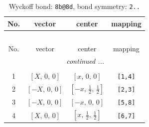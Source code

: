 \documentclass[fleqn,8pt]{jsarticle}
\begin{document}
\renewcommand{\arraystretch}{1.2}
\begin{longtable}{cccc}
\caption{Wyckoff bond: {\tt 8b@8d}, bond symmetry: {\tt 2..}}
 \\
 \hline \hline
No. & vector & center & mapping \\ \hline \endfirsthead

\multicolumn{3}{l}{\tablename\ \thetable{}} \\
 \hline \hline
No. & vector & center & mapping \\ \hline \endhead

 \hline \hline
\multicolumn{3}{r}{\footnotesize\it continued ...} \\ \endfoot

 \hline \hline
\multicolumn{3}{r}{} \\ \endlastfoot

1 & $\left[ X,\, 0,\, 0 \right]$ & $\left[ x,\, 0,\, 0 \right]$ & {\tt [1,4]} \\ \hline
2 & $\left[ - X,\, 0,\, 0 \right]$ & $\left[ - x,\, \frac{1}{2},\, \frac{1}{2} \right]$ & {\tt [2,3]} \\ \hline
3 & $\left[ - X,\, 0,\, 0 \right]$ & $\left[ - x,\, 0,\, 0 \right]$ & {\tt [5,8]} \\ \hline
4 & $\left[ X,\, 0,\, 0 \right]$ & $\left[ x,\, \frac{1}{2},\, \frac{1}{2} \right]$ & {\tt [6,7]} \\
\end{longtable}
\renewcommand{\arraystretch}{1.2}
\end{document}
